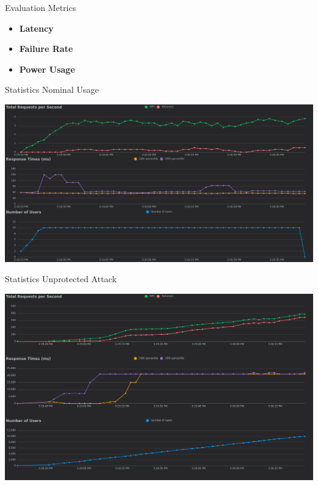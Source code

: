 \documentclass{beamer}
\begin{document}
\begin{frame}{Evaluation Metrics}
  \begin{itemize}
    \item \textbf{Latency} 
    \item \textbf{Failure Rate}
    \item \textbf{Power Usage}
  \end{itemize}
\end{frame}


\begin{frame}{Statistics}
    Nominal Usage
    \vspace{1em}
    \begin{center}
        \includegraphics[width=\textwidth]{images/nominal_usage.png}
    \end{center}
\end{frame}

\begin{frame}{Statistics}
    Unprotected Attack
    \vspace{1em}
    \begin{center}
        \includegraphics[width=\textwidth]{images/ddos_usage.png}
    \end{center}
\end{frame}
\end{document}
